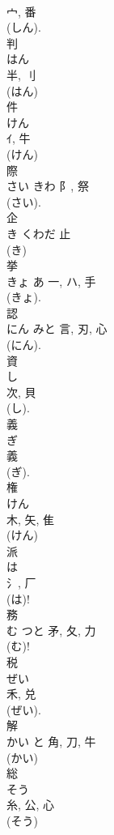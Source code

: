 \documentclass[8pt]{extreport}
\begin{document}
\begin{CJK}{UTF8}{min}
\\	宀, 番	
\\	(しん). 
\\	判	
\\	はん	
\\	半, 刂	
\\	(はん) 
\\	件	
\\	けん	
\\	ｲ, 牛	
\\	(けん) 
\\	際	
\\	さい	きわ	阝, 祭	
\\	(さい). 
\\	企	
\\	き	くわだ	止		
\\	(き) 
\\	挙	
\\	きょ	あ	一, ハ, 手		
\\	(きょ). 
\\	認	
\\	にん	みと	言, 刃, 心	
\\	(にん).	
\\	資	
\\	し	
\\	次, 貝	
\\	(し). 
\\	義	
\\	ぎ	
\\	義	
\\	(ぎ).	
\\	権	
\\	けん	
\\	木, 矢, 隹	
\\	(けん) 
\\	派	
\\	は	
\\	氵, 厂		
\\	(は)!
\\	務	
\\	む	つと	矛, 夂, 力	
\\	(む)!
\\	税	
\\	ぜい	
\\	禾, 兑	
\\	(ぜい). 
\\	解	
\\	かい	と	角, 刀, 牛	
\\	(かい) 
\\	総	
\\	そう	
\\	糸, 公, 心	
\\	(そう) 

\end{CJK}
\end{document}
